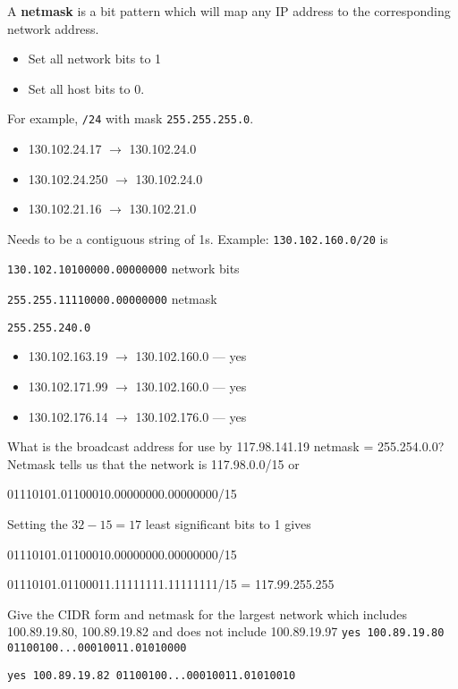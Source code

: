 \documentclass[10pt, a4paper]{article}
\begin{document}
\begin{multicols}{4}
    A \textbf{netmask} is a bit pattern which will map any IP address to the corresponding network address.
    \begin{itemize}
        \item Set all network bits to 1
        \item Set all host bits to 0.
    \end{itemize}
    For example, \texttt{/24} with mask \texttt{255.255.255.0}.
    \begin{itemize}
        \item 130.102.24.17 $\to$ 130.102.24.0
        \item 130.102.24.250 $\to$ 130.102.24.0
        \item 130.102.21.16 $\to$ 130.102.21.0
    \end{itemize}
    Needs to be a contiguous string of 1s. Example:
    \texttt{130.102.160.0/20} is

    \texttt{\color{blue}130.102.1010\color{black}0000.00000000} network bits

    \texttt{\color{blue}255.255.1111\color{black}0000.00000000} netmask

    \texttt{255.255.240.0}
    \begin{itemize}
        \item 130.102.163.19 $\to$ 130.102.160.0 --- yes
        \item 130.102.171.99 $\to$ 130.102.160.0 --- yes
        \item 130.102.176.14 $\to$ 130.102.176.0 --- yes
    \end{itemize}

    What is the broadcast address for use by 117.98.141.19 netmask = 255.254.0.0?
    Netmask tells us that the network is 117.98.0.0/15 or

    01110101.01100010.00000000.00000000/15

    Setting the $32-15 = 17$ least significant bits to 1 gives

    01110101.0110001\color{blue}0.00000000.00000000\color{black}/15
    
    01110101.0110001\color{blue}1.11111111.11111111\color{black}/15 = 117.99.255.255

    Give the CIDR form and netmask for the largest network which includes 100.89.19.80, 100.89.19.82 and does not include 100.89.19.97
    \tiny
    \texttt{yes 100.89.19.80 01100100...00010011.01\color{blue}0\color{black}10000}
    
    \texttt{yes 100.89.19.82 01100100...00010011.01\color{blue}0\color{black}10010}
    

\end{multicols}
\end{document}
